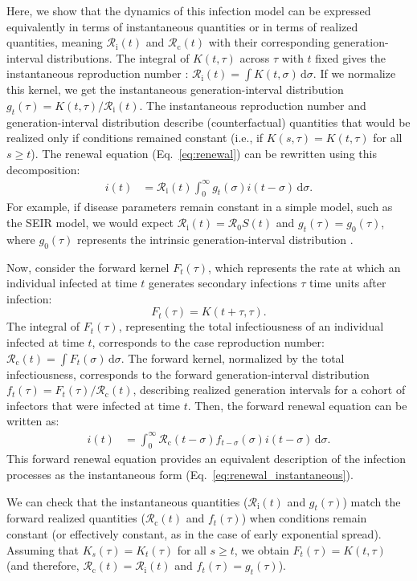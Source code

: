 \documentclass[12pt]{article}
\newcommand{\eref}[1]{Eq.~\ref{eq:#1}}
\newcommand{\Rx}[1]{\ensuremath{{\mathcal R}_{#1}}\xspace}
\newcommand{\Ro}{\Rx{0}}
\newcommand{\Rc}{\Rx{\mathrm{c}}}
\newcommand{\Ri}{\Rx{\mathrm{i}}}
\newcommand{\dd}[1]{\ensuremath{\, \mathrm{d}#1}}
\newcommand{\dsigma}{\dd{\sigma}}
\begin{document}
Here, we show that the dynamics of this infection model can be expressed equivalently in terms of instantaneous quantities or in terms of realized quantities, meaning $\Ri(t)$ and $\Rc(t)$ with their corresponding generation-interval distributions.
The integral of $K(t, \tau)$ across $\tau$ with $t$ fixed gives the instantaneous reproduction number \citep{fraser2007estimating}: $\Ri(t) = \int K(t, \sigma) \dsigma$.
If we normalize this kernel, we get the instantaneous generation-interval distribution $g_t(\tau) = K(t, \tau)/\Ri(t)$.
The instantaneous reproduction number and generation-interval distribution describe (counterfactual) quantities that would be realized only if conditions remained constant (i.e., if $K(s, \tau) = K(t, \tau)$ for all $s \geq t$).
The renewal equation (\eref{renewal}) can be rewritten using this decomposition:
\begin{align}
i(t) &= \Ri(t) \int_0^\infty g_t(\sigma) i(t-\sigma) \dsigma.
\label{eq:renewal_instantaneous}
\end{align}
For example, if disease parameters remain constant in a simple model, such as the SEIR model, we would expect $\Ri(t) = \Ro S(t)$ and $g_t(\tau) = g_0(\tau)$, where $g_0(\tau)$ represents the intrinsic generation-interval distribution \citep{champredon2015intrinsic}.

Now, consider the forward kernel $F_t(\tau)$, which represents the rate at which an individual infected at time $t$ generates secondary infections $\tau$ time units after infection: 
\begin{equation}
F_t(\tau) = K(t+\tau, \tau).
\label{eq:fkernel}
\end{equation}
The integral of $F_t(\tau)$, representing the total infectiousness of an individual infected at time $t$, corresponds to the case reproduction number: $\Rc(t) = \int F_t(\sigma) \dsigma$. 
The forward kernel, normalized by the total infectiousness, corresponds to the forward generation-interval distribution $f_t(\tau) = F_t(\tau)/\Rc(t)$, describing realized generation intervals for a cohort of infectors that were infected at time $t$.
Then, the forward renewal equation can be written as:
\begin{align}
i(t) &= \int_0^\infty \Rc(t-\sigma) f_{t-\sigma}(\sigma) i(t-\sigma) \dsigma.
\label{eq:renewal_forward}
\end{align}
This forward renewal equation provides an equivalent description of the infection processes as the instantaneous form (\eref{renewal_instantaneous}).

We can check that the instantaneous quantities ($\Ri(t)$ and $g_t(\tau)$) match the forward realized quantities ($\Rc(t)$ and $f_t(\tau)$) when conditions remain constant (or effectively constant, as in the case of early exponential spread).
Assuming that $K_s(\tau) = K_t(\tau)$ for all $s \geq t$, we obtain $F_{t}(\tau) = K(t, \tau)$ (and therefore, $\Rc(t) = \Ri(t)$ and $f_{t}(\tau) = g_t(\tau)$).
\end{document}
